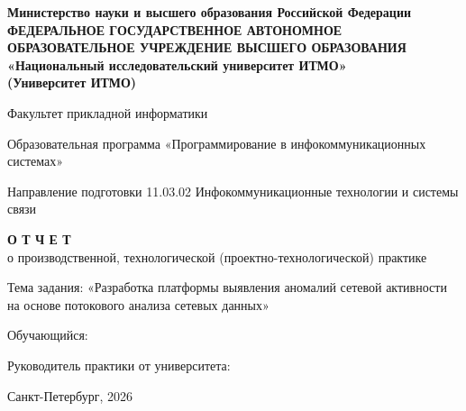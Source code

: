 \thispagestyle{empty}
\begin{center}
    \textbf{Министерство науки и высшего образования Российской Федерации}\\
    \textbf{ФЕДЕРАЛЬНОЕ ГОСУДАРСТВЕННОЕ АВТОНОМНОЕ ОБРАЗОВАТЕЛЬНОЕ УЧРЕЖДЕНИЕ ВЫСШЕГО ОБРАЗОВАНИЯ}\\
    \textbf{«Национальный исследовательский университет ИТМО»}\\
    \textbf{(Университет ИТМО)}
    
    \vspace{1cm}
    
    Факультет прикладной информатики
    
    Образовательная программа «Программирование в инфокоммуникационных системах»
    
    Направление подготовки 11.03.02 Инфокоммуникационные технологии и системы связи
    
    \vspace{3cm}
    
    \textbf{О Т Ч Е Т}\\
    о производственной, технологической (проектно-технологической) практике
    
    \vspace{0.7cm}
    
    Тема задания: «Разработка платформы выявления аномалий сетевой активности на основе потокового анализа сетевых данных»
    
    \vspace{3cm}
    
    \begin{flushleft}
        Обучающийся: \underline{\hspace{6cm}} \\
        
        \vspace{0.5cm}
        
        Руководитель практики от университета: \underline{\hspace{5cm}}
    \end{flushleft}
    
    \vfill
    
    Санкт-Петербург, 2026
\end{center}
